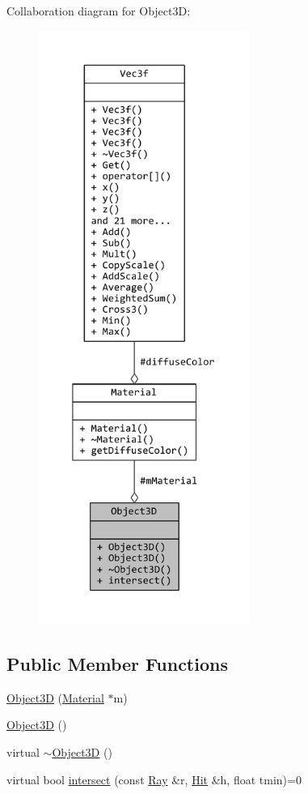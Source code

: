 Collaboration diagram for Object3\+D\+:
\nopagebreak
\begin{figure}[H]
\begin{center}
\leavevmode
\includegraphics[height=550pt]{classObject3D__coll__graph}
\end{center}
\end{figure}
\subsection*{Public Member Functions}
\begin{DoxyCompactItemize}
\item 
\hyperlink{classObject3D_ae29d1ad924cb8ab4b1b5c5647622f390}{Object3\+D} (\hyperlink{classMaterial}{Material} $\ast$m)
\item 
\hyperlink{classObject3D_ae3a1b17fb43ab59f5cf7b0ee21b9120b}{Object3\+D} ()
\item 
virtual \hyperlink{classObject3D_a0e0c43c27593f99b303319cbb54b9c50}{$\sim$\+Object3\+D} ()
\item 
virtual bool \hyperlink{classObject3D_a58f07cf2b37c5b6a1c796cd7a939f91b}{intersect} (const \hyperlink{classRay}{Ray} \&r, \hyperlink{classHit}{Hit} \&h, float tmin)=0
\end{DoxyCompactItemize}

